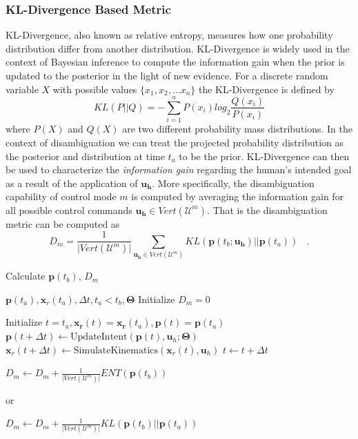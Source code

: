 \documentclass[conference]{IEEEtran}
\begin{document}
\subsubsection{KL-Divergence Based Metric}\label{sssec:kl}
KL-Divergence, also known as relative entropy, measures how one probability distribution differ from another distribution. KL-Divergence is widely used in the context of Bayesian inference to compute the information gain when the prior is updated to the posterior in the light of new evidence. For a discrete random variable $X$ with possible values $\{x_1, x_2,\dots x_n\}$ the KL-Divergence is defined by
\begin{equation*}
KL(P||Q) = -\sum_{i=1}^{n}P(x_i)log_2\frac{Q(x_i)}{P(x_i)}
\end{equation*}
where $P(X)$ and $Q(X)$ are two different probability mass distributions. 
In the context of disambiguation we can treat the projected probability distribution as the posterior and distribution at time $t_a$ to be the prior. KL-Divergence can then be used to characterize the \textit{information gain} regarding the human's intended goal as a result of the application of $\boldsymbol{u_h}$. More specifically, the disambiguation capability of control mode $m$ is computed by averaging the information gain for all possible control commands $\boldsymbol{u_h} \in Vert(\mathcal{U}^m)$. That is the disambiguation metric can be computed as 
\begin{equation*}
D_m = \frac{1}{\vert Vert(\mathcal{U}^m) \vert}\sum_{\boldsymbol{u_h} \in Vert(\mathcal{U}^m)} KL(\boldsymbol{p}(t_b; \boldsymbol{u_h})||\boldsymbol{p}(t_a))~~~~.
\end{equation*}
\begin{algorithm}[t]
	\caption{Calculate $\boldsymbol{p}(t_b)$, $D_m$}
	\label{alg:disamb}
	\begin{algorithmic}[1]
		\REQUIRE $\boldsymbol{p}(t_a), \boldsymbol{x}_r(t_a), \Delta t, t_a < t_b, \boldsymbol{\Theta}$
		\STATE Initialize $D_m = 0$
		
		\STATE Initialize $t = t_a, \boldsymbol{x_r}(t) = \boldsymbol{x_r}(t_a), \boldsymbol{p}(t) = \boldsymbol{p}(t_a)$
		\STATE $\boldsymbol{p}(t + \Delta t) \leftarrow \text{UpdateIntent}(\boldsymbol{p}(t), \boldsymbol{u}_h; \boldsymbol{\Theta})$
		\STATE $\boldsymbol{x}_r(t + \Delta t) \leftarrow \text{SimulateKinematics}(\boldsymbol{x}_r(t), \boldsymbol{u}_h)$
		\STATE $t \leftarrow t + \Delta t$
		\ENDWHILE
		
		\STATE $D_m \leftarrow D_m + \frac{1}{\vert Vert(\mathcal{U}^m) \vert} ENT(\boldsymbol{p}(t_b)) $
		
		or
		
		\STATE $D_m \leftarrow D_m + \frac{1}{\vert Vert(\mathcal{U}^m) \vert} KL(\boldsymbol{p}(t_b) \vert\vert \boldsymbol{p}(t_a)) $
		
		\ENDFOR
		\ENDFOR
	\end{algorithmic}
\end{algorithm}
\end{document}
